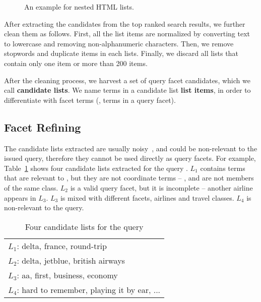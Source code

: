 \begin{figure}[ht!]
\centering
{}
\caption{An example for nested HTML lists.}
\label{fig:nestedlist}
\end{figure}

After extracting the candidates from the top ranked search results, we further clean them as follows.
First, all the list items are normalized by converting text to lowercase and removing non-alphanumeric characters.
Then, we remove stopwords and duplicate items in each lists.
Finally, we discard all lists that contain only one item or more than 200 items. 

After the cleaning process, we harvest a set of query facet candidates, which we call \textbf{candidate lists}. We name terms in a candidate list \textbf{list items}, in order to differentiate with facet terms (\ie, terms in a query facet).

\subsection{Facet Refining}
\label{sec:facet-refine}
The candidate lists extracted are usually noisy~\cite{zhang2009employing},
and could be non-relevant to the issued query, therefore they cannot be used directly as query facets. For example, Table~\ref{tab:candidates} shows four candidate lists extracted for the query . $L_1$ contains terms that are relevant to , but they are not coordinate terms -- ,  and  are not members of the same class. 
$L_2$ is a valid query facet, but it is incomplete -- another airline  appears in $L_3$. $L_3$ is mixed with different facets, airlines and travel classes. $L_4$ is non-relevant to the query. 
\begin{table}[ht!]
\centering
\caption{Four candidate lists for the query }
\label{tab:candidates}
\begin{tabular}{|l|} \hline
$L_1$: delta, france, round-trip\\
$L_2$: delta, jetblue, british airways\\ 
$L_3$: aa, first, business, economy\\
$L_4$: hard to remember, playing it by ear, ...\\
\hline
\end{tabular}
\end{table}

